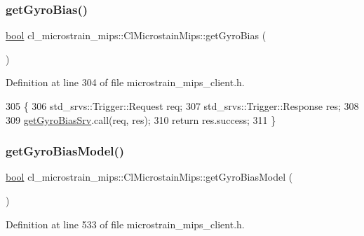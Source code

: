 \subsubsection{\texorpdfstring{get\+Gyro\+Bias()}{getGyroBias()}}
{\footnotesize\ttfamily \hyperlink{classbool}{bool} cl\+\_\+microstrain\+\_\+mips\+::\+Cl\+Microstain\+Mips\+::get\+Gyro\+Bias (\begin{DoxyParamCaption}{ }\end{DoxyParamCaption})\hspace{0.3cm}{\ttfamily [inline]}}



Definition at line 304 of file microstrain\+\_\+mips\+\_\+client.\+h.


\begin{DoxyCode}
305     \{
306         std\_srvs::Trigger::Request req;
307         std\_srvs::Trigger::Response res;
308 
309         \hyperlink{classcl__microstrain__mips_1_1ClMicrostainMips_a2f3eaec7f31a54d833773ebb5eb03b64}{getGyroBiasSrv}.call(req, res);
310         \textcolor{keywordflow}{return} res.success;
311     \}
\end{DoxyCode}
\mbox{\label{classcl__microstrain__mips_1_1ClMicrostainMips_a9a4353f87640e524750cf919bdcdbf2d}} 
\subsubsection{\texorpdfstring{get\+Gyro\+Bias\+Model()}{getGyroBiasModel()}}
{\footnotesize\ttfamily \hyperlink{classbool}{bool} cl\+\_\+microstrain\+\_\+mips\+::\+Cl\+Microstain\+Mips\+::get\+Gyro\+Bias\+Model (\begin{DoxyParamCaption}{ }\end{DoxyParamCaption})\hspace{0.3cm}{\ttfamily [inline]}}



Definition at line 533 of file microstrain\+\_\+mips\+\_\+client.\+h.


